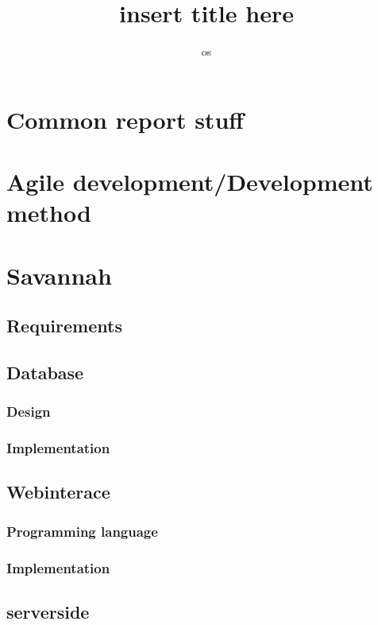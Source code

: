 

\title{insert title here}
\author{os}


\maketitle
\tableofcontents




\chapter{Common report stuff} %
\chapter{Agile development/Development method} %
\chapter{Savannah} %
  \section{Requirements}
  \section{Database}
    \subsection{Design}
    \subsection{Implementation}

  \section{Webinterace}
     \subsection{Programming language}
      
     \subsection{Implementation}

  \section{serverside} %
